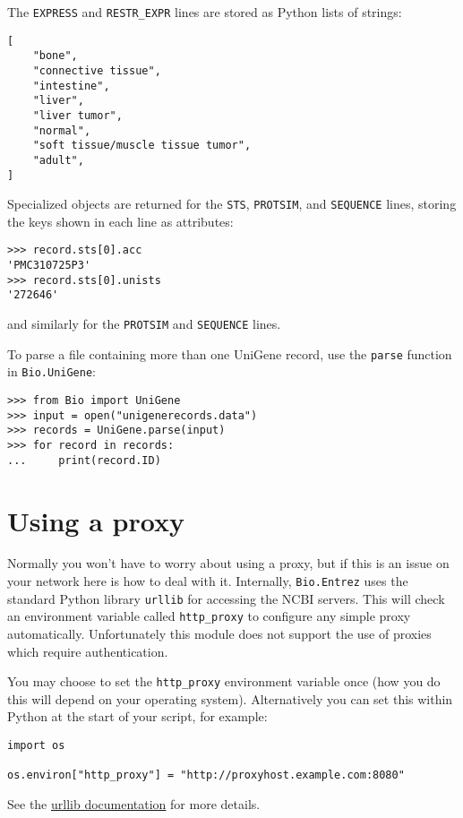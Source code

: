 The \verb+EXPRESS+ and \verb+RESTR_EXPR+ lines are stored as Python lists of strings:
\begin{verbatim}
[
    "bone",
    "connective tissue",
    "intestine",
    "liver",
    "liver tumor",
    "normal",
    "soft tissue/muscle tissue tumor",
    "adult",
]
\end{verbatim}

Specialized objects are returned for the \verb+STS+, \verb+PROTSIM+, and \verb+SEQUENCE+ lines, storing the keys shown in each line as attributes:
\begin{verbatim}
>>> record.sts[0].acc
'PMC310725P3'
>>> record.sts[0].unists
'272646'
\end{verbatim}
and similarly for the \verb+PROTSIM+ and \verb+SEQUENCE+ lines.

To parse a file containing more than one UniGene record, use the \verb+parse+ function in \verb+Bio.UniGene+:

\begin{verbatim}
>>> from Bio import UniGene
>>> input = open("unigenerecords.data")
>>> records = UniGene.parse(input)
>>> for record in records:
...     print(record.ID)
\end{verbatim}

\section{Using a proxy}

Normally you won't have to worry about using a proxy, but if this is an issue
on your network here is how to deal with it.  Internally, \verb|Bio.Entrez|
uses the standard Python library \verb|urllib| for accessing the NCBI servers.
This will check an environment variable called \verb|http_proxy| to configure
any simple proxy automatically.  Unfortunately this module does not support
the use of proxies which require authentication.

You may choose to set the \verb|http_proxy| environment variable once (how you
do this will depend on your operating system).  Alternatively you can set this
within Python at the start of your script, for example:

\begin{verbatim}
import os

os.environ["http_proxy"] = "http://proxyhost.example.com:8080"
\end{verbatim}

\noindent See the \href{https://docs.python.org/2/library/urllib.html}
{urllib documentation} for more details.

